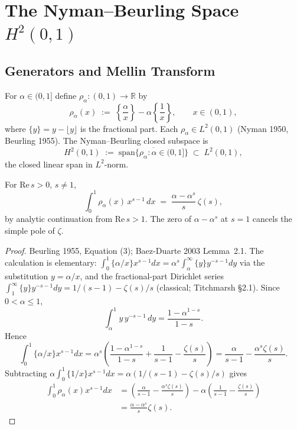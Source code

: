 \section{The Nyman--Beurling Space \(H^{2}(0,1)\)}
\label{v4-arith:w7-b:NB-space}

\subsection{Generators and Mellin Transform}
\label{v4-arith:w7-b:NB-space:generators}

\begin{definition}
\label{v4-arith:w7-b:def:rho-alpha}
For \(\alpha\in(0,1]\) define
\(\rho_{\alpha}\colon(0,1)\to\mathbb{R}\) by
\begin{equation}
\label{v4-arith:w7-b:eq:rho-alpha}
\rho_{\alpha}(x)\;:=\;\left\{\frac{\alpha}{x}\right\}-\alpha\!\left\{\frac{1}{x}\right\},\qquad x\in(0,1),
\end{equation}
where \(\{y\}=y-\lfloor y\rfloor\) is the fractional part. Each
\(\rho_{\alpha}\in L^{2}(0,1)\) (Nyman 1950, Beurling 1955). The
Nyman--Beurling closed subspace is
\begin{equation}
\label{v4-arith:w7-b:eq:H2-space}
H^{2}(0,1)\;:=\;\overline{\mathrm{span}\{\rho_{\alpha}:\alpha\in(0,1]\}}\;\subset\;L^{2}(0,1),
\end{equation}
the closed linear span in \(L^{2}\)-norm.
\end{definition}

\begin{lemma}
\label{v4-arith:w7-b:lem:mellin-rho}
For \(\mathrm{Re}\,s>0\), \(s\neq 1\),
\begin{equation}
\label{v4-arith:w7-b:eq:mellin-rho}
\int_{0}^{1}\rho_{\alpha}(x)\,x^{s-1}\,dx
\;=\;\frac{\alpha-\alpha^{s}}{s}\,\zeta(s),
\end{equation}
by analytic continuation from \(\mathrm{Re}\,s>1\). The zero of
\(\alpha-\alpha^s\) at \(s=1\) cancels the simple pole of \(\zeta\).
\end{lemma}

\begin{proof}
Beurling 1955, Equation (3); Baez-Duarte 2003 Lemma~2.1. The
calculation is elementary: \(\int_{0}^{1}\{\alpha/x\}x^{s-1}dx=
\alpha^{s}\int_{\alpha}^{\infty}\{y\}y^{-s-1}dy\) via the substitution
\(y=\alpha/x\), and the fractional-part Dirichlet series
\(\int_{1}^{\infty}\{y\}y^{-s-1}dy=1/(s-1)-\zeta(s)/s\) (classical;
Titchmarsh \S2.1). Since \(0<\alpha\le1\),
\[
\int_{\alpha}^{1} y\,y^{-s-1}\,dy=\frac{1-\alpha^{1-s}}{1-s}.
\]
Hence
\[
\int_{0}^{1}\{\alpha/x\}x^{s-1}dx
=\alpha^{s}\left(\frac{1-\alpha^{1-s}}{1-s}
+\frac{1}{s-1}-\frac{\zeta(s)}{s}\right)
=\frac{\alpha}{s-1}-\frac{\alpha^s\zeta(s)}{s}.
\]
Subtracting \(\alpha\int_0^1\{1/x\}x^{s-1}dx
=\alpha(1/(s-1)-\zeta(s)/s)\) gives
\begin{align*}
\int_{0}^{1}\rho_{\alpha}(x)x^{s-1}dx
&=\left(\frac{\alpha}{s-1}-\frac{\alpha^s\zeta(s)}{s}\right)
-\alpha\left(\frac{1}{s-1}-\frac{\zeta(s)}{s}\right)\\
&=\frac{\alpha-\alpha^s}{s}\zeta(s).
\end{align*}
\end{proof}


